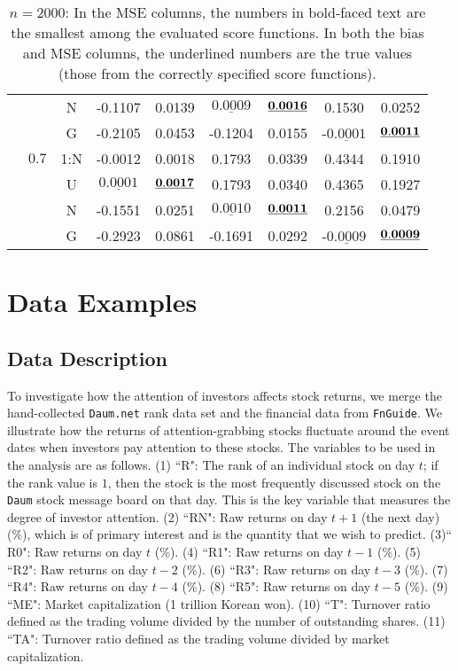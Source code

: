 \documentclass[12pt]{article}
\newcommand{\ul}{\underline}
\begin{document}
\begin{table}[htp!]
\begin{center}
{\begin{tabular}{|c|c|c|c|c|c|c|c|c| }
	&	   &N&    -0.1107  & 0.0139    &$\ul{ 0.0009}$  &${\bf\ul{ 0.0016}}$ & 0.1530  & 0.0252    \\
&		   &G&    -0.2105  & 0.0453    & -0.1204  & 0.0155  &-$\ul{0.0001}$  &${\bf\ul{ 0.0011}}$  \\
	\cline{2-9}		
&		 $0.7$&1:N&    -0.0012  & 0.0018    & 0.1793  & 0.0339 & 0.4344  & 0.1910    \\
&		   &U& $\ul{   0.0001}$  &${\bf\ul{ 0.0017}}$  & 0.1793  & 0.0340 & 0.4365  & 0.1927    \\
&		   &N&    -0.1551  & 0.0251    &$\ul{ 0.0010}$  &${\bf\ul{ 0.0011}}$ & 0.2156  & 0.0479    \\
&		   &G&    -0.2923  & 0.0861    & -0.1691  & 0.0292 &-$\ul{0.0009}$  &${\bf\ul{ 0.0009}}$  \\ \hline 
       \end{tabular}}
\bigskip
	   \caption{$n=2000$: In the MSE columns, the numbers in bold-faced text are the smallest among the evaluated score functions. In both the bias and MSE columns, the underlined numbers are the true values (those from the correctly specified score functions).}
\end{center}
\end{table}	


\section{Data Examples} 


\subsection{Data Description}

To investigate how the attention of investors affects stock returns, we merge 
the hand-collected \texttt{Daum.net} rank data set and the financial data from \texttt{FnGuide}. 
 We illustrate how the returns of attention-grabbing stocks  
fluctuate around the event dates when investors pay attention to these stocks.  
The variables to be used in the analysis are as follows.
(1)  ``R":  The rank of an individual stock on day $t$; if the rank value is $1$, then the stock is 
the most frequently discussed stock on the \texttt{Daum} stock message board on that day. This is the key variable that 
measures the degree of investor attention. 
(2) ``RN": Raw returns on day $t+1$ (the next day) (\%), which is of
primary interest and is the quantity that we wish to predict.
(3)`` R0": Raw returns on day $t$ (\%).  
(4) ``R1": Raw returns on day $t-1$ (\%). 
(5) ``R2": Raw returns on day $t-2$ (\%). 
(6) ``R3": Raw returns on day $t-3$ (\%). 
(7) ``R4": Raw returns on day $t-4$ (\%). 
(8) ``R5": Raw returns on day $t-5$ (\%).
(9) ``ME": Market capitalization (1 trillion Korean won). 
(10) ``T": Turnover ratio defined as the trading volume divided by the number of outstanding shares. 
(11) ``TA": Turnover ratio defined as the trading volume divided by market capitalization.
\end{document}
